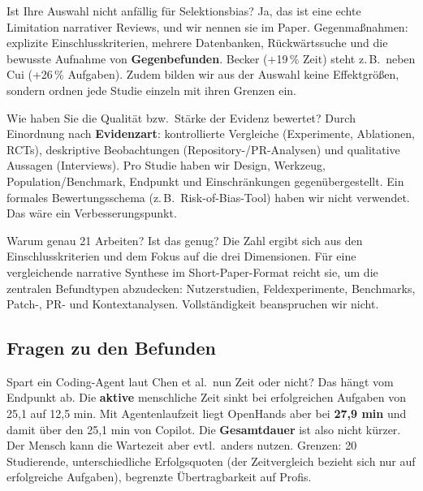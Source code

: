 \documentclass[12pt,a4paper]{article}
\begin{document}
\begin{qa}{Ist Ihre Auswahl nicht anfällig für Selektionsbias?}
Ja, das ist eine echte Limitation narrativer Reviews, und wir nennen sie im Paper. Gegenmaßnahmen: explizite Einschlusskriterien, mehrere Datenbanken, Rückwärtssuche und die bewusste Aufnahme von \textbf{Gegenbefunden}. Becker (+19\,\% Zeit) steht z.\,B.\ neben Cui (+26\,\% Aufgaben). Zudem bilden wir aus der Auswahl keine Effektgrößen, sondern ordnen jede Studie einzeln mit ihren Grenzen ein.
\end{qa}

\begin{qa}{Wie haben Sie die Qualität bzw.\ Stärke der Evidenz bewertet?}
Durch Einordnung nach \textbf{Evidenzart}: kontrollierte Vergleiche (Experimente, Ablationen, RCTs), deskriptive Beobachtungen (Repository-/PR-Analysen) und qualitative Aussagen (Interviews). Pro Studie haben wir Design, Werkzeug, Population/Benchmark, Endpunkt und Einschränkungen gegenübergestellt. Ein formales Bewertungsschema (z.\,B.\ Risk-of-Bias-Tool) haben wir nicht verwendet. Das wäre ein Verbesserungspunkt.
\end{qa}

\begin{qa}{Warum genau 21 Arbeiten? Ist das genug?}
Die Zahl ergibt sich aus den Einschlusskriterien und dem Fokus auf die drei Dimensionen. Für eine vergleichende narrative Synthese im Short-Paper-Format reicht sie, um die zentralen Befundtypen abzudecken: Nutzerstudien, Feldexperimente, Benchmarks, Patch-, PR- und Kontextanalysen. Vollständigkeit beanspruchen wir nicht.
\end{qa}

\subsection{Fragen zu den Befunden}

\begin{qa}{Spart ein Coding-Agent laut Chen et al.\ nun Zeit oder nicht?}
Das hängt vom Endpunkt ab. Die \textbf{aktive} menschliche Zeit sinkt bei erfolgreichen Aufgaben von 25,1 auf 12,5 min. Mit Agentenlaufzeit liegt OpenHands aber bei \textbf{27,9 min} und damit über den 25,1 min von Copilot. Die \textbf{Gesamtdauer} ist also nicht kürzer. Der Mensch kann die Wartezeit aber evtl.\ anders nutzen. Grenzen: 20 Studierende, unterschiedliche Erfolgsquoten (der Zeitvergleich bezieht sich nur auf erfolgreiche Aufgaben), begrenzte Übertragbarkeit auf Profis.
\end{qa}
\end{document}
